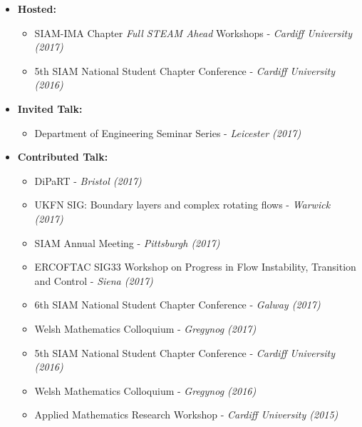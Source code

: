 \documentclass[11pt,a4paper,sans]{moderncv}        %
\begin{document}
\vspace{6pt}

\begin{itemize}

\item{\textbf{Hosted:} 
\begin{itemize}
\vspace{3pt}
\item SIAM-IMA Chapter \textit{Full STEAM Ahead} Workshops - \textit{Cardiff University (2017)}
\vspace{3pt}
\item 5th SIAM National Student Chapter Conference - \textit{Cardiff University (2016)}
\end{itemize}}

\vspace{6pt}

\item{\textbf{Invited Talk:}
\begin{itemize}
\vspace{3pt}
\item Department of Engineering Seminar Series - \textit{Leicester (2017)}
\vspace{3pt}
\end{itemize}}


\vspace{6pt}

\item{\textbf{Contributed Talk:}
\begin{itemize}
\vspace{3pt}
\item DiPaRT - \textit{Bristol (2017)}
\vspace{3pt}
\item UKFN SIG: Boundary layers and complex rotating flows - \textit{Warwick (2017)}
\vspace{3pt}
\item SIAM Annual Meeting - \textit{Pittsburgh (2017)}
\vspace{3pt}
\item ERCOFTAC SIG33 Workshop on Progress in Flow Instability, Transition
and Control - \textit{Siena (2017)}
\vspace{3pt}
\item 6th SIAM National Student Chapter Conference - \textit{Galway (2017)}
\vspace{3pt}
\item Welsh Mathematics Colloquium - \textit{Gregynog (2017)}
\vspace{3pt}
\item 5th SIAM National Student Chapter Conference - \textit{Cardiff University (2016)}
\vspace{3pt}
\item Welsh Mathematics Colloquium - \textit{Gregynog (2016)}
\vspace{3pt}
\item Applied Mathematics Research Workshop - \textit{Cardiff University (2015)}
\end{itemize}}


\end{itemize}
\end{document}
